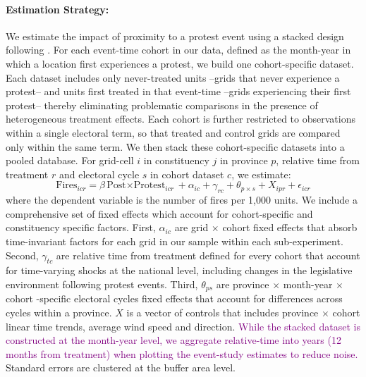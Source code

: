 \documentclass[12pt]{article}
\begin{document}
\paragraph{Estimation Strategy:}
We estimate the impact of proximity to a protest event using a stacked design following \citet{cengiz2019effect}. For each event-time cohort in our data, defined as the month-year in which a location first experiences a protest, we build one cohort-specific dataset. Each dataset includes only never-treated units --grids that never experience a protest-- and units first treated in that event-time --grids experiencing their first protest-- thereby eliminating problematic comparisons in the presence of heterogeneous treatment effects. Each cohort is further restricted to observations within a single electoral term, so that treated and control grids are compared only within the same term. We then stack these cohort-specific datasets into a pooled database. For grid-cell $i$ in constituency $j$ in province $p$, relative time from treatment $r$ and electoral cycle $s$ in cohort dataset $c$, we estimate: %
\begin{equation}\label{eq_protest}
 { \text{Fires} }_{i c r}=\beta {\text{Post$\times$Protest}}_{i c r}+ \alpha_{ic}+ \gamma_{rc} + \theta_{p \times s}+ X_{ipr} + \epsilon_{icr}
\end{equation}
where the dependent variable is the number of fires per 1,000 units. We include a comprehensive set of fixed effects which account for cohort-specific and constituency specific factors. First, $\alpha_{ic}$ are grid $\times$ cohort fixed effects that absorb time-invariant factors for each grid in our sample within each sub-experiment. Second, $\gamma_{tc}$ are relative time from treatment defined for every cohort that account for time-varying shocks at the national level, including changes in the legislative environment following protest events. Third, $\theta_{ps}$ are province $\times$ month-year $\times$ cohort -specific electoral cycles fixed effects that account for differences across cycles within a province. $X$ is a vector of controls that includes province $\times$ cohort  linear time trends, average wind speed and direction. \textcolor{purple}{While the stacked dataset is constructed at the month-year level, we aggregate relative-time into years (12 months from treatment) when plotting the event-study estimates to reduce noise.} Standard errors are clustered at the buffer area level.
\end{document}
